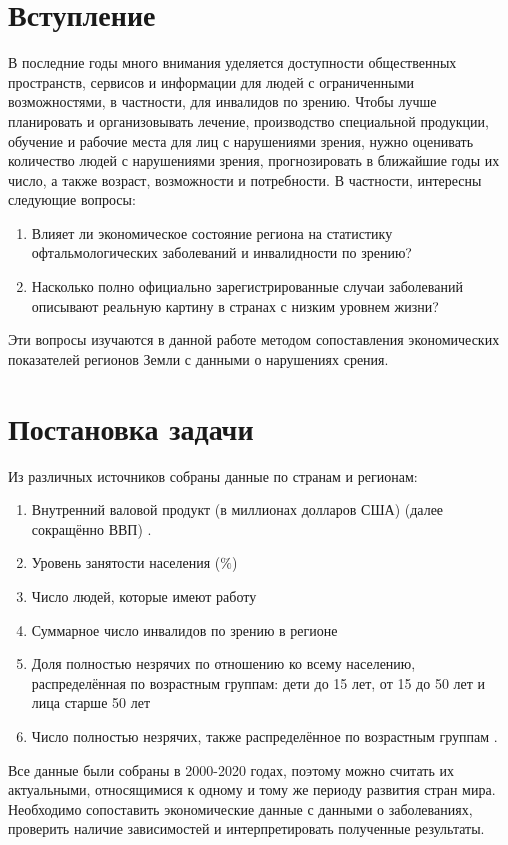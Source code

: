 \documentclass[main.tex]{subfiles}
\begin{document}
\section{Вступление}
В последние годы много внимания уделяется доступности общественных пространств, сервисов и информации для людей с ограниченными возможностями, в частности, для инвалидов по зрению. Чтобы лучше планировать и организовывать лечение, производство специальной продукции, обучение и рабочие места для лиц с нарушениями зрения, нужно оценивать количество людей с нарушениями зрения, прогнозировать в ближайшие годы их число, а также возраст, возможности и потребности. В частности, интересны следующие вопросы:
\begin{enumerate}
	\item Влияет ли экономическое состояние региона на статистику офтальмологических заболеваний и инвалидности по зрению?
	\item Насколько полно официально зарегистрированные случаи заболеваний  описывают реальную картину в странах с низким уровнем жизни?
\end{enumerate}
Эти вопросы изучаются в данной работе методом сопоставления экономических показателей регионов Земли с данными о нарушениях срения.

\newpage
\section{Постановка задачи}
Из различных источников собраны данные по странам и регионам:
\begin{enumerate}
	\item Внутренний валовой продукт (в миллионах долларов США) (далее сокращённо ВВП) \cite{gdp}.
	\item Уровень занятости населения ($\%$) \cite{productivity-loss}
	\item Число людей, которые имеют работу \cite{productivity-loss}
	\item Суммарное число инвалидов по зрению в регионе \cite{who-health-life-estimates}
	\item Доля полностью незрячих по отношению ко всему населению, распределённая по возрастным группам: дети до 15 лет, от 15 до 50 лет и лица старше 50 лет \cite{who-vi-2002}
	\item Число полностью незрячих, также распределённое по возрастным группам \cite{who-vi-2002}.
\end{enumerate}
Все данные были собраны в 2000-2020 годах, поэтому можно считать их актуальными, относящимися к одному и тому же периоду развития  стран мира.\\
Необходимо сопоставить экономические данные с данными о заболеваниях, проверить наличие зависимостей и интерпретировать полученные результаты.
\end{document}
